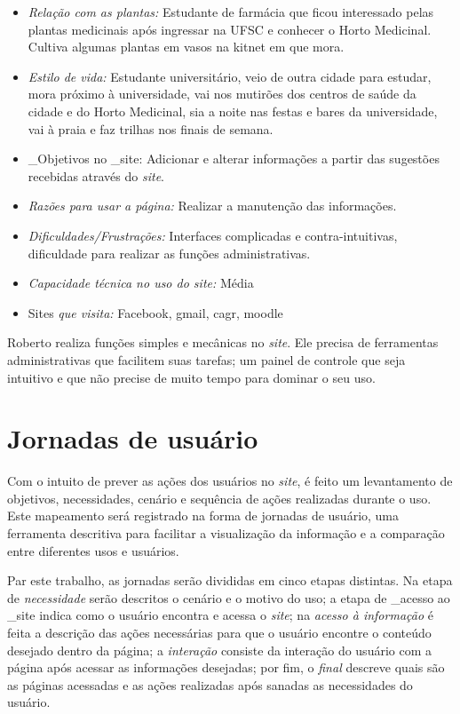 \begin{itemize}
\item
  \emph{Relação com as plantas:} Estudante de farmácia que ficou interessado pelas plantas medicinais após ingressar na UFSC e conhecer o Horto Medicinal. Cultiva algumas plantas em vasos na kitnet em que mora.
\item
  \emph{Estilo de vida:} Estudante universitário, veio de outra cidade para estudar, mora próximo à universidade, vai nos mutirões dos centros de saúde da cidade e do Horto Medicinal, sia a noite nas festas e bares da universidade, vai à praia e faz trilhas nos finais de semana.
\item
  \_Objetivos no \_site: Adicionar e alterar informações a partir das sugestões recebidas através do \emph{site}.
\item
  \emph{Razões para usar a página:} Realizar a manutenção das informações.
\item
  \emph{Dificuldades/Frustrações:} Interfaces complicadas e contra-intuitivas, dificuldade para realizar as funções administrativas.
\item
  \emph{Capacidade técnica no uso do \emph{site}:} Média
\item
  Sites \emph{que visita:} Facebook, gmail, cagr, moodle
\end{itemize}

Roberto realiza funções simples e mecânicas no \emph{site}. Ele precisa de ferramentas administrativas que facilitem suas tarefas; um painel de controle que seja intuitivo e que não precise de muito tempo para dominar o seu uso.

\section{Jornadas de usuário}\label{jornadas-de-usuario}

Com o intuito de prever as ações dos usuários no \emph{site}, é feito um levantamento de objetivos, necessidades, cenário e sequência de ações realizadas durante o uso. Este mapeamento será registrado na forma de jornadas de usuário, uma ferramenta descritiva para facilitar a visualização da informação e a comparação entre diferentes usos e usuários.

Par este trabalho, as jornadas serão divididas em cinco etapas distintas. Na etapa de \emph{necessidade} serão descritos o cenário e o motivo do uso; a etapa de \_acesso ao \_site indica como o usuário encontra e acessa o \emph{site}; na \emph{acesso à informação} é feita a descrição das ações necessárias para que o usuário encontre o conteúdo desejado dentro da página; a \emph{interação} consiste da interação do usuário com a página após acessar as informações desejadas; por fim, o \emph{final} descreve quais são as páginas acessadas e as ações realizadas após sanadas as necessidades do usuário.

